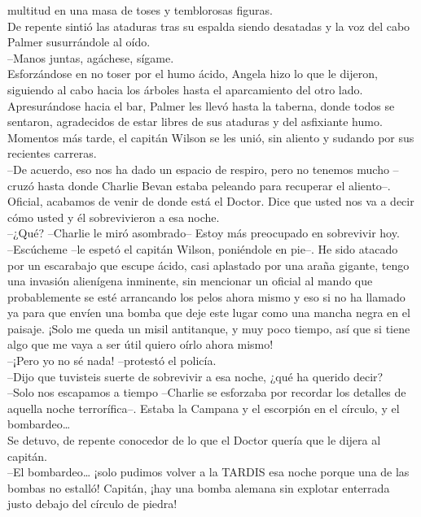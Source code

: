 multitud en una masa de toses y temblorosas figuras.\\
De repente sintió las ataduras tras su espalda siendo desatadas y la voz
del cabo Palmer susurrándole al oído.\\
--Manos juntas, agáchese, sígame.\\
Esforzándose en no toser por el humo ácido, Angela hizo lo que le
dijeron, siguiendo al cabo hacia los árboles hasta el aparcamiento del
otro lado.\\
Apresurándose hacia el bar, Palmer les llevó hasta la taberna, donde
todos se sentaron, agradecidos de estar libres de sus ataduras y del
asfixiante humo.\\
Momentos más tarde, el capitán Wilson se les unió, sin aliento y sudando
por sus recientes carreras.\\
--De acuerdo, eso nos ha dado un espacio de respiro, pero no tenemos
mucho --cruzó hasta donde Charlie Bevan estaba peleando para recuperar
el aliento--. Oficial, acabamos de venir de donde está el Doctor. Dice
que usted nos va a decir cómo usted y él sobrevivieron a esa noche.\\
--¿Qué? --Charlie le miró asombrado-- Estoy más preocupado en sobrevivir
hoy.\\
--Escúcheme --le espetó el capitán Wilson, poniéndole en pie--. He sido
atacado por un escarabajo que escupe ácido, casi aplastado por una araña
gigante, tengo una invasión alienígena inminente, sin mencionar un
oficial al mando que probablemente se esté arrancando los pelos ahora
mismo y eso si no ha llamado ya para que envíen una bomba que deje este
lugar como una mancha negra en el paisaje. ¡Solo me queda un misil
antitanque, y muy poco tiempo, así que si tiene algo que me vaya a ser
útil quiero oírlo ahora mismo!\\
--¡Pero yo no sé nada! --protestó el policía.\\
--Dijo que tuvisteis suerte de sobrevivir a esa noche, ¿qué ha querido
decir?\\
--Solo nos escapamos a tiempo --Charlie se esforzaba por recordar los
detalles de aquella noche terrorífica--. Estaba la Campana y el
escorpión en el círculo, y el bombardeo\ldots{}\\
Se detuvo, de repente conocedor de lo que el Doctor quería que le dijera
al capitán.\\
--El bombardeo\ldots{} ¡solo pudimos volver a la TARDIS esa noche porque
una de las bombas no estalló! Capitán, ¡hay una bomba alemana sin
explotar enterrada justo debajo del círculo de piedra!\\
